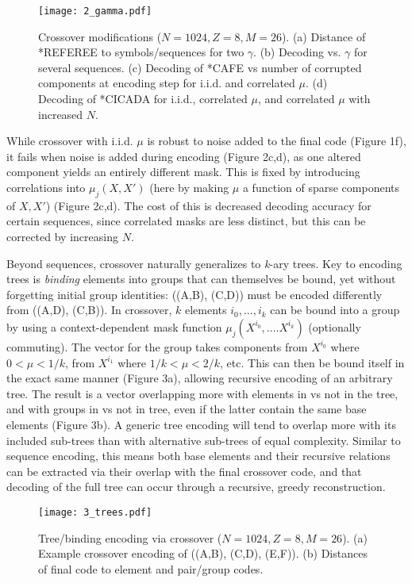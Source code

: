 \documentclass{article}
\begin{document}
\begin{figure}
\label{fig:2}
  \centering
  \texttt{[image: 2\_gamma.pdf]}
  \caption{Crossover modifications ($N=1024, Z=8, M=26$). (a) Distance of *REFEREE to symbols/sequences for two $\gamma$. (b) Decoding vs. $\gamma$ for several sequences. (c) Decoding of *CAFE vs number of corrupted components at encoding step for i.i.d. and correlated $\mu$. (d) Decoding of *CICADA for i.i.d., correlated $\mu$, and correlated $\mu$ with increased $N$.}
\end{figure}

While crossover with i.i.d. $\mu$ is robust to noise added to the final code (Figure 1f), it fails when noise is added during encoding (Figure 2c,d), as one altered component yields an entirely different mask. This is fixed by introducing correlations into $\mu_j(X, X')$ (here by making $\mu$ a function of sparse components of $X, X'$) (Figure 2c,d). The cost of this is decreased decoding accuracy for certain sequences, since correlated masks are less distinct, but this can be corrected by increasing $N$.

Beyond sequences, crossover naturally generalizes to \textit{k}-ary trees. Key to encoding trees is \textit{binding} elements into groups that can themselves be bound, yet without forgetting initial group identities: ((A,B), (C,D)) must be encoded differently from ((A,D), (C,B)). In crossover, $k$ elements $i_0, ..., i_k$ can be bound into a group by using a context-dependent mask function $\mu_j(X^{i_0}, .... X^{i_k})$ (optionally commuting). The vector for the group takes components from $X^{i_0}$ where $0 < \mu < 1/k$, from $X^{i_1}$ where $1/k < \mu < 2/k$, etc. This can then be bound itself in the exact same manner (Figure 3a), allowing recursive encoding of an arbitrary tree. The result is a vector overlapping more with elements in vs not in the tree, and with groups in vs not in tree, even if the latter contain the same base elements (Figure 3b). A generic tree encoding will tend to overlap more with its included sub-trees than with alternative sub-trees of equal complexity. Similar to sequence encoding, this means both base elements and their recursive relations can be extracted via their overlap with the final crossover code, and that decoding of the full tree can occur through a recursive, greedy reconstruction.

\begin{figure}
\label{fig:3}
  \centering
  \texttt{[image: 3\_trees.pdf]}
  \caption{Tree/binding encoding via crossover ($N=1024, Z=8, M=26$). (a) Example crossover encoding of ((A,B), (C,D), (E,F)). (b) Distances of final code to element and pair/group codes.}
\end{figure}
\end{document}

